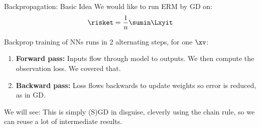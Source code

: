 \documentclass[11pt,compress,t,notes=noshow, xcolor=table]{beamer}
\begin{document}

\begin{frame}{Backpropagation: Basic Idea}
We would like to run ERM by GD on: $$ \risket = \frac{1}{n} \sumin \Lxyit$$ 

Backprop training of NNs runs in 2 alternating steps, for one $\xv$:
\begin{enumerate}
\item \textbf{Forward pass:} Inputs flow through model to outputs. 
    We then compute the observation loss. We covered that.
\item \textbf{Backward pass:} Loss flows backwards to update weights so error is reduced,
    as in GD.
\end{enumerate}
\lz
We will see: This is simply (S)GD in disguise, cleverly using the chain rule, so we can reuse
a lot of intermediate results.
\end{frame}


\end{document}
